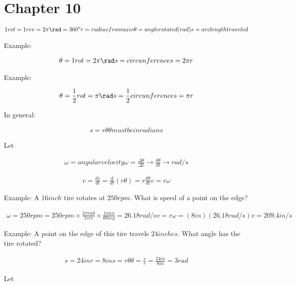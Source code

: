 \section{Chapter 10}
	\begin{align}
		1 rot = 1 rev = 2 \pi \rad = 360^{o}
		r = radius from axis
		\theta = angle rotated (rad)
		s = arc length traveled
	\end{align}

	Example:

	\begin{align}
		\theta = 1 rot = 2 \pi \rad
		s = circunference
		s = 2 \pi r
	\end{align}

	Example:

	\begin{align}
		\theta = \frac{1}{2} rot = \pi \rad
		s = \frac{1}{2} circunference
		s = \pi r
	\end{align}

	In general:

	\begin{align}
		s = r \theta
		\theta must be in radians
	\end{align}

	Let

	\begin{align}
		\omega = angular velocity
		\omega = \frac{\Delta \theta}{\Delta t} \to \frac{d \theta}{dt} \to rad/s
	\end{align}

	\begin{align}
		v = \frac{ds}{dt} = \frac{d}{dt} (r \theta)
		= r \frac{d \theta}{dt}
		v = r \omega
	\end{align}

	Example: A $16 inch$ tire rotates at $250 rpm$. What is speed of a point on the edge?

	\begin{align}
		\omega = 250 rpm
		= 250 rpm
		\times \frac{2 \pi rad}{1 rev}
		\times \frac{1 min}{60 seg}
		= 26.18 rad/s
		v = r \omega
		= (8 in) (26.18 rad/s)
		v = 209.4 in/s
	\end{align}

	Example: A point on the edge of this tire travels $24 inches$. What angle has the tire rotated?

	\begin{align}
		s = 24 in
		r = 8 in
		s = r \theta
		\theta = \frac{s}{r} = \frac{24 in}{8 in} = 3 rad
	\end{align}

	Let

